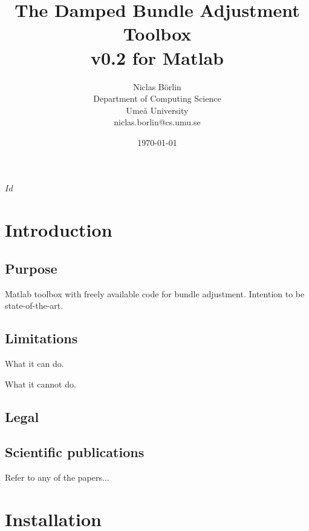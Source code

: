 \documentclass{article}
\begin{document}


\svnInfo $Id$

\newcommand{\dbatversion}{0.2}

\title{The Damped Bundle Adjustment Toolbox\\v\dbatversion{} for Matlab}
\author{Niclas B{\"o}rlin\\Department of Computing Science\\Ume{\aa}
  University\\niclas.borlin@cs.umu.se}
\date{\today}

\maketitle

\newpage

\tableofcontents

\newpage

\section{Introduction}

\subsection{Purpose}

Matlab toolbox with freely available code for bundle adjustment.
Intention to be state-of-the-art.

\subsection{Limitations}

What it can do.

What it cannot do.

\subsection{Legal}



\subsection{Scientific publications}

Refer to any of the papers...

\cite{Borlin2013:Bundle}
\cite{Borlin2013:Experiments}

\section{Installation}
\label{sec:install}
\end{document}
